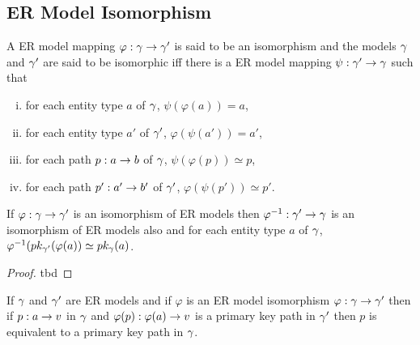 \subsection{ER Model Isomorphism}

\begin{definition}
A ER model mapping $\varphi: \gmodel \morph \gmodel'$ is said to be an isomorphism
and the models $\gmodel$ and $\gmodel'$ are said to be isomorphic iff there is a ER model mapping $\psi: \gmodel' \morph \gmodel$ such that
\begin{enumerate}[(i)]
\item for each entity type $a$ of $\gmodel$, $\psi(\varphi(a))=a$,
\item for each entity type $a'$ of $\gmodel'$, $\varphi(\psi(a'))=a'$,
\item for each path $p: a \morph b$ of $\gmodel$, $\psi(\varphi(p)) \simeq p$,
\item for each path $p':a' \morph b'$ of $\gmodel'$, $\varphi(\psi(p')) \simeq p'$.
\end{enumerate}
\end{definition}

\begin{lemma}
If $\varphi: \gmodel \morph \gmodel'$ is an isomorphism of ER models then
$\varphi^{-1}: \gmodel' \morph \gmodel$ is an isomorphism of ER models also and
for each entity type $a$ of $\gmodel$, $\varphi^{-1}(\pk[\gmodel']{\varphi(a)}\simeq\pk{a}$.
\end{lemma}
\begin{proof}
tbd
\end{proof}

\begin{lemma}
If $\gmodel$ and $\gmodel'$ are ER models and if $\varphi$ is an ER model isomorphism $\varphi: \gmodel \morph \gmodel'$ then if $p:a \morph \veee$ in $\gmodel$ and $\varphi(p) :\varphi(a) \morph \veee$ is a primary key path in $\gmodel'$ then $p$ is equivalent to a primary key path in $\gmodel$.
\end{lemma}

